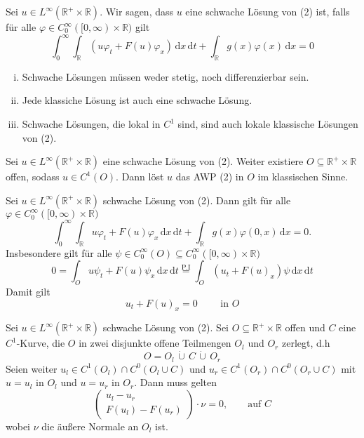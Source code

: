 \begin{definition*}
	Sei $u \in L^{\infty}(\mathbb{R}^+ \times \mathbb{R})$. Wir sagen, dass $u$ eine schwache Lösung von (2) ist, falls für alle $\varphi \in C^{\infty}_0([0,\infty) \times \mathbb{R})$ gilt
	\[
		\int_{0}^{\infty} \int_{\mathbb{R}}^{} (u \varphi_t + F(u) \varphi_x) \,\mathrm{d}x \,\mathrm{d}t + \int_{\mathbb{R}}^{} g(x) \varphi(x) \,\mathrm{d}x = 0
	\]
\end{definition*}
\begin{bemerkung}
	\begin{enumerate}[(i)]
		\item Schwache Lösungen müssen weder stetig, noch differenzierbar sein.
		\item Jede klassiche Lösung ist auch eine schwache Lösung.
		\item Schwache Lösungen, die lokal in $C^1$ sind, sind auch lokale klassische Lösungen von (2). 
	\end{enumerate}
\end{bemerkung}
\begin{lemma}
	Sei $u \in L^{\infty}(\mathbb{R}^+ \times \mathbb{R})$ eine schwache Lösung von (2). Weiter existiere $ O \subseteq  \mathbb{R}^+ \times \mathbb{R}$ offen, sodass $u \in C^1(O)$. Dann löst $u$ das AWP (2) in $O$ im klassischen Sinne.
\end{lemma}
\begin{beweis}
	Sei $u \in L^{\infty}(\mathbb{R}^+ \times \mathbb{R})$ schwache Lösung von (2). Dann gilt für alle $\varphi \in C^{\infty}_0([0,\infty) \times \mathbb{R})$
	\[
		\int_{0}^{\infty} \int_{\mathbb{R}}^{} u \varphi_t + F(u) \varphi_x \,\mathrm{d}x \,\mathrm{d}t + \int_{\mathbb{R}}^{} g(x)\varphi(0,x) \,\mathrm{d}x = 0.
	\]
	Insbesondere gilt für alle $\psi \in C^{\infty}_0(O) \subseteq C_0^{\infty}([0,\infty)\times \mathbb{R})$
	\[
		0 = \int_{O}^{} u \psi_t + F(u) \psi_x \,\mathrm{d}x \,\mathrm{d}t \stackrel{\text{P.I}}{=} \int_{O}^{} (u_t+F(u)_x)\psi \,\mathrm{d}x \,\mathrm{d}t
	\]
	Damit gilt
	\[
		u_t + F(u)_x = 0 \qquad \text{ in }O
	\]
\end{beweis}
\begin{lemma}
	Sei $u \in L^{\infty}(\mathbb{R}^+ \times \mathbb{R})$ schwache Lösung von (2). Sei $O \subseteq \mathbb{R}^+ \times \mathbb{R}$ offen und $C$ eine $C^1$-Kurve, 
	die $O$ in zwei disjunkte offene Teilmengen $O_l$ und $O_r$ zerlegt, d.h 
	\[
	 	O = O_l \, \dot\cup \, C \, \dot\cup \, O_r
	\]
	Seien weiter $u_l \in C^1(O_l) \cap C^0(O_l \cup C)$ und $u_r \in C^1(O_r) \cap C^0(O_r \cup C)$ mit $u = u_l$ in $O_l$ und $u= u_r$ in $O_r$. Dann muss gelten
	\[
		\begin{pmatrix}
			u_l - u_r \\
			F(u_l)- F(u_r)
		\end{pmatrix} \cdot \nu = 0, \qquad \text{auf }C
	\]
	wobei $\nu$ die äußere Normale an $O_l$ ist.
\end{lemma}
